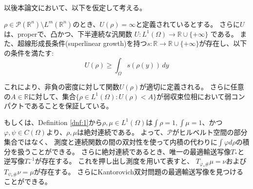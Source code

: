 以後本論文において、以下を仮定して考える。
\begin{ass}
\label{ass:2}

$\rho \in \mathcal{P}(\mathbb{R}^n) \setminus L^m(\mathbb{R}^n)$のとき、$U(\rho) = \infty$と定義されているとする。
さらに$U$は、properで、凸かつ、下半連続な汎関数 $U: L^1(\Omega) \to \mathbb{R} \cup  \{+ \infty\}$ である。
また、超線形成長条件(superlinear growth)を持つ$s: \mathbb{R} \to \mathbb{R} \cup  \{+ \infty\}$が存在し、以下の条件を満たす$:$
$$
    U(\rho) \geq \int_\Omega s(\rho(y)) \, dy
$$

これにより、非負の密度に対して関数$U(\rho)$が適切に定義される。
さらに任意の$A \in \mathbb{R}$に対して、集合$\{ \rho \in L^1(\Omega): U(\rho) < A\}$が弱収束位相において弱コンパクトであることを保証している。

もしくは、Definition \ref{dnf:1}から$\rho, \mu \in L^1(\Omega)$は$\int \rho = 1, \int \mu = 1$、かつ$\varphi, \psi \in C(\Omega)$より、$\rho, \mu$は絶対連続である。
よって、$\mathcal{P}$がヒルベルト空間の部分集合ではなく、
測度と連続関数の間の双対性を使って内積の代わりに$\int \varphi d \rho$の積分を扱うことができる。
さらに絶対連続であるとき、唯一の最適輸送写像$T_*$と逆写像$T_*^{-1}$が存在する。
これを押し出し測度を用いて表すと、
$T_{\varphi_* \#} \mu = \nu$および$T_{\psi_* \#} \nu = \mu$が存在する。
さらにKantorovich双対問題の最適輸送写像を見つけることができる。

\begin{comment}

確率測度 $\mu$ がルベーグ積分に関して絶対連続であるとき、測度 $\mu$ と連続関数 $f$ の積分は、次の式で表されます。

\[
\int_\Omega f(x) \, \mu(dx) = \int_\Omega f(x) \, \rho(x) dx
\]


ここで、$\rho$ は $\mu$ の密度関数です。

この式は、ルベーグ積分と測度の積分の関係から導かれます。

ルベーグ積分では、関数 $f$ がルベーグ可積分であることを条件に、次の式で定義されます。

\[
\int_\Omega f(x) \, dx = \sup \left\{ \sum_{k=1}^\infty \lambda_k f(x_k) \mid \{x_k\} \subset \Omega, \sum_{k=1}^\infty \lambda_k < \infty \right\}
\]

確率測度 $\mu$ がルベーグ積分に関して絶対連続であるとき、$\mu$ の密度関数 $\rho$ は存在し、$\mu(A) = \int_A \rho(x) dx$ が成立します。

したがって、次の等式が成立します。

\[
\int_\Omega f(x) \, \mu(dx) = \int_\Omega f(x) \, \rho(x) dx
\]
この式は、確率測度と連続関数の積分を計算する際によく使用されます。
\end{comment}

\end{ass}


